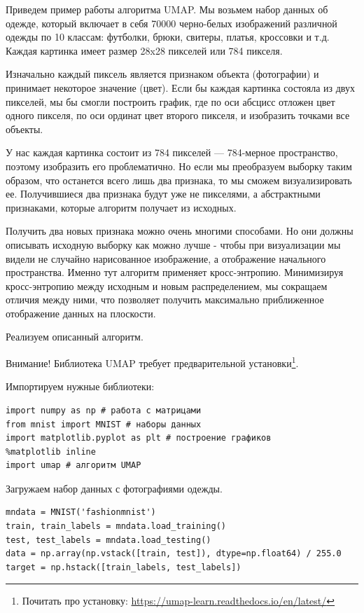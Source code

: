 	Приведем пример работы алгоритма UMAP. Мы возьмем набор данных об одежде, который включает в себя 70000 черно-белых изображений различной одежды по 10 классам: футболки, брюки, свитеры, платья, кроссовки и т.д. Каждая картинка имеет размер 28x28 пикселей или 784 пикселя.
	
	Изначально каждый пиксель является признаком объекта (фотографии) и принимает некоторое значение (цвет). Если бы каждая картинка состояла из двух пикселей, мы бы смогли построить график, где по оси абсцисс отложен цвет одного пикселя, по оси ординат цвет второго пикселя, и изобразить точками все объекты.
	
	У нас каждая картинка состоит из 784 пикселей --- 784-мерное пространство, поэтому изобразить его проблематично. Но если мы преобразуем выборку таким образом, что останется всего лишь два признака, то мы сможем визуализировать ее. Получившиеся два признака будут уже не пикселями, а абстрактными признаками, которые алгоритм получает из исходных.
	
	Получить два новых признака можно очень многими способами. Но они должны описывать исходную выборку как можно лучше - чтобы при визуализации мы видели не случайно нарисованное изображение, а отображение начального пространства. Именно тут алгоритм применяет кросс-энтропию. Минимизируя кросс-энтропию между исходным и новым распределением, мы сокращаем отличия между ними, что позволяет получить максимально приближенное отображение данных на плоскости.
	
	Реализуем описанный алгоритм.
	
	Внимание! Библиотека UMAP требует предварительной установки\footnote{Почитать про установку: \url{https://umap-learn.readthedocs.io/en/latest/}}.
	
	Импортируем нужные библиотеки:
	\begin{verbatim}
import numpy as np # работа с матрицами
from mnist import MNIST # наборы данных
import matplotlib.pyplot as plt # построение графиков
%matplotlib inline
import umap # алгоритм UMAP
	\end{verbatim}
	
	Загружаем набор данных с фотографиями одежды.
	\begin{verbatim}
mndata = MNIST('fashionmnist')
train, train_labels = mndata.load_training() 
test, test_labels = mndata.load_testing()
data = np.array(np.vstack([train, test]), dtype=np.float64) / 255.0
target = np.hstack([train_labels, test_labels])
	\end{verbatim}


